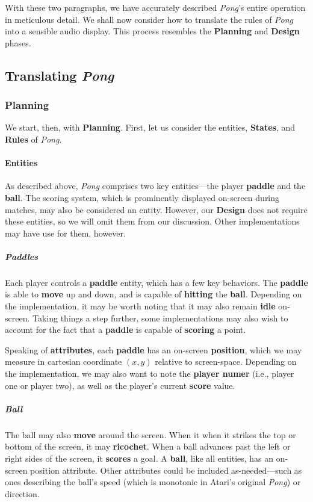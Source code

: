 \documentclass{report}
\newcommand{\plan}{\textbf{Planning}\xspace}
\newcommand{\design}{\textbf{Design}\xspace}
\newcommand{\state}[1]{\textbf{#1}}
\newcommand{\rules}{\textbf{Rules}\xspace}
\newcommand{\pad}{\textbf{paddle}\xspace}
\newcommand{\ball}{\textbf{ball}\xspace}
\begin{document}
With these two paragraphs, we have accurately described \emph{Pong}'s entire operation in meticulous detail. We shall now consider how to translate the rules of \emph{Pong} into a sensible audio display. This process resembles the \plan and \design phases.

\subsection{Translating \emph{Pong}}
\subsubsection{Planning}
We start, then, with \plan. First, let us consider the entities, \state{States}, and \rules of \emph{Pong.}

\paragraph{Entities}

As described above, \emph{Pong} comprises two key entities---the player \pad and the \ball.
The scoring system, which is prominently displayed on-screen during matches, may also be considered an entity. However, our \design does not require these entities, so we will omit them from our discussion. Other implementations may have use for them, however.

\subparagraph{Paddles}

Each player controls a \pad entity, which has a few key behaviors. The \pad is able to \state{move} up and down, and is capable of \state{hitting} the \ball. Depending on the implementation, it may be worth noting that it may also remain \state{idle} on-screen. Taking things a step further, some implementations may also wish to account for the fact that a \pad is capable of \state{scoring} a point. 

Speaking of \state{attributes}, each \pad has an on-screen \state{position}, which we may measure in cartesian coordinate $(x,y)$ relative to screen-space. Depending on the implementation, we may also want to note the \state{player numer} (i.e., player one or player two), as well as the player's current \state{score} value. 

\subparagraph{Ball} The ball may also \state{move} around the screen. When it when it strikes the top or bottom of the screen, it may \state{ricochet}. When a ball advances past the left or right sides of the screen, it \state{scores} a goal. 
A \ball, like all entities, has an on-screen position attribute. Other attributes could be included as-needed---such as ones describing the ball's speed (which is monotonic in Atari's original \emph{Pong}) or direction.
\end{document}
